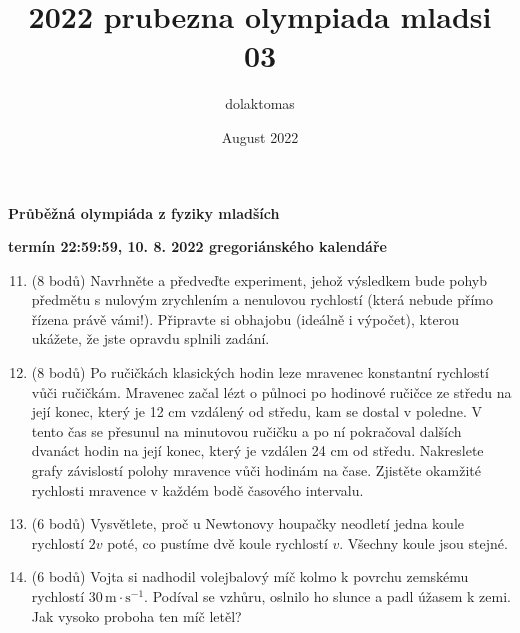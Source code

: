 \documentclass[a4paper, 12pt]{article}
\title{2022 prubezna olympiada mladsi 03}
\author{dolaktomas }
\date{August 2022}
\begin{document}
\begin{center}
    \textbf{\Large Průběžná olympiáda z fyziky mladších}
    \vspace{1em}

    \textbf{termín 22:59:59, 10. 8. 2022 gregoriánského kalendáře}
\end{center}


\begin{enumerate}[label=\arabic*)]
\setcounter{enumi}{10}
     \item (8 bodů) Navrhněte a předveďte experiment, jehož výsledkem bude pohyb předmětu s nulovým zrychlením a nenulovou rychlostí (která nebude přímo řízena právě vámi!). Připravte si obhajobu (ideálně i výpočet), kterou ukážete, že jste opravdu splnili zadání.
     
     \item (8 bodů) Po ručičkách klasických hodin leze mravenec konstantní rychlostí vůči ručičkám. Mravenec začal lézt o půlnoci po hodinové ručičce ze středu na její konec, který je 12 cm vzdálený od středu, kam se dostal v poledne. V tento čas se přesunul na minutovou ručičku a po ní pokračoval dalších dvanáct hodin na její konec, který je vzdálen 24 cm od středu. Nakreslete grafy závislostí polohy mravence vůči hodinám na čase. Zjistěte okamžité rychlosti mravence v každém bodě časového intervalu.

     \item (6 bodů) Vysvětlete, proč u Newtonovy houpačky neodletí jedna koule rychlostí $2v$ poté, co pustíme dvě koule rychlostí $v$. Všechny koule jsou stejné.

     \item (6 bodů) Vojta si nadhodil volejbalový míč kolmo k povrchu zemskému rychlostí $30\, \mathrm{m}\cdot\mathrm{s}^{-1}$. Podíval se vzhůru, oslnilo ho slunce a padl úžasem k zemi. Jak vysoko proboha ten míč letěl?
     
     

\end{enumerate}
\end{document}
